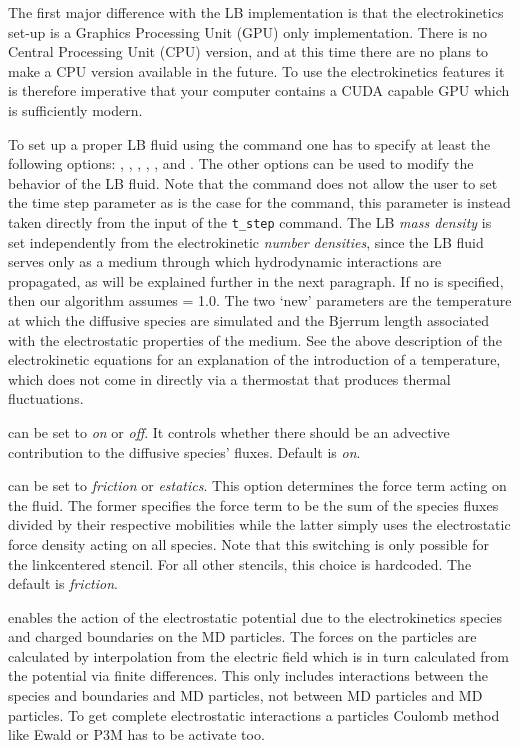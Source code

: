 The first major difference with the LB implementation is that the 
electrokinetics set-up is a Graphics Processing Unit (GPU) only implementation. 
There is no Central Processing Unit (CPU) version, and at this time there are no
plans to make a CPU version available in the future. To use the electrokinetics
features it is therefore imperative that your computer contains a CUDA capable
GPU which is sufficiently modern. 

To set up a proper LB fluid using the  command one has to
specify at least the following options: , , ,
, , and . The other options can be used to 
modify the behavior of the LB fluid. Note that the  command 
does not allow the user to set the time step parameter  as is the case for
the  command, this parameter is instead taken directly from the input
of the  \texttt{t\_step} command. The LB \emph{mass density} is set 
independently from the electrokinetic \emph{number densities}, since the LB fluid 
serves only as a medium through which hydrodynamic interactions are propagated, 
as will be explained further in the next paragraph. If no  is
specified, then our algorithm assumes  = 1.0. The two `new'
parameters are  the temperature at which the diffusive species are simulated
and  the Bjerrum length associated with the electrostatic 
properties of the medium. See the above description of the electrokinetic 
equations for an explanation of the introduction of a temperature, which does 
not come in directly via a thermostat that produces thermal fluctuations.

 can be set to \emph{on} or \emph{off}. It controls whether there
should be an advective contribution to the diffusive species' fluxes. Default is
\emph{on}.

 can be set to \emph{friction} or \emph{estatics}. This option
determines the force term acting on the fluid. The former specifies the force term
to be the sum of the species fluxes divided by their respective mobilities while the
latter simply uses the electrostatic force density acting on all species. Note that 
this switching is only possible for the linkcentered stencil. For all other stencils,
this choice is hardcoded. The default is \emph{friction}.

 enables the action of the electrostatic potential
due to the electrokinetics species and charged boundaries on the MD particles.
The forces on the particles are calculated by interpolation from the electric
field which is in turn calculated from the potential via finite differences.
This only includes interactions between the species and boundaries and MD
particles, not between MD particles and MD particles. To get complete electrostatic
interactions a particles Coulomb method like Ewald or P3M has to be activate too.

